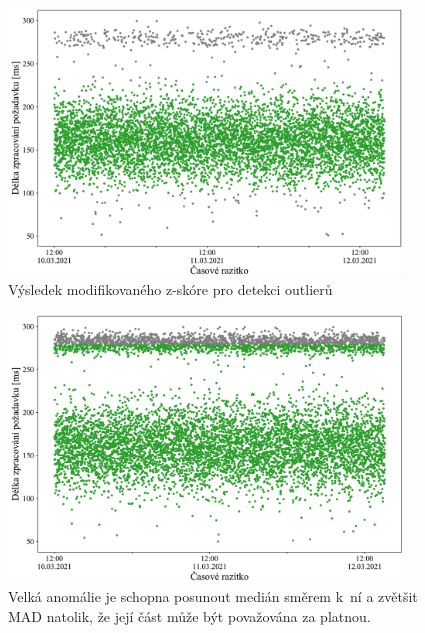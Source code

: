\begin{figure}[!hbt]
    \centering
    \includegraphics[width=0.935\textwidth]{obrazky/modified-zscore-outlier-detection-success.pdf}
    \caption{Výsledek modifikovaného z-skóre pro detekci outlierů}
    \label{modified-zscore-outlier-detection-success-img}
\end{figure}

\begin{figure}[!hbt]
    \centering
    \includegraphics[width=0.935\textwidth]{obrazky/modified-zscore-outlier-detection-fail.pdf}
    \caption{Velká anomálie je schopna posunout medián směrem k~ní a zvětšit MAD natolik, že její část může být považována za platnou.}
    \label{modified-zscore-outlier-detection-fail-img}
\end{figure}

